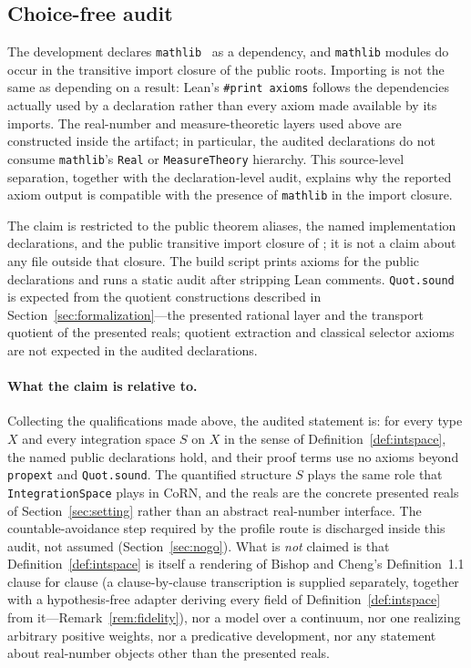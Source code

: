 \documentclass[11pt]{article}
\theoremstyle{definition}
\theoremstyle{remark}
\begin{document}
\subsection{Choice-free audit}
\label{sec:audit}

The development declares \texttt{mathlib}~\cite{mathlib-2020} as a dependency, and \texttt{mathlib} modules do occur in the transitive import closure of the public roots.  Importing is not the same as depending on a result: Lean's \texttt{\#print axioms} follows the dependencies actually used by a declaration rather than every axiom made available by its imports.  The real-number and measure-theoretic layers used above are constructed inside the artifact; in particular, the audited declarations do not consume \texttt{mathlib}'s \texttt{Real} or \texttt{MeasureTheory} hierarchy.  This source-level separation, together with the declaration-level audit, explains why the reported axiom output is compatible with the presence of \texttt{mathlib} in the import closure.

The claim is restricted to the public theorem aliases, the named implementation declarations, and the public transitive import closure of ; it is not a claim about any file outside that closure.  The build script prints axioms for the public declarations and runs a static audit after stripping Lean comments.  \texttt{Quot.sound} is expected from the quotient constructions described in Section~\ref{sec:formalization}---the presented rational layer and the transport quotient of the presented reals; quotient extraction and classical selector axioms are not expected in the audited declarations.

\paragraph{What the claim is relative to.}
Collecting the qualifications made above, the audited statement is: for every type \(X\) and every integration space $S$ on $X$ in the sense of Definition~\ref{def:intspace}, the named public declarations hold, and their proof terms use no axioms beyond \texttt{propext} and \texttt{Quot.sound}.  The quantified structure \(S\) plays the same role that \texttt{IntegrationSpace} plays in CoRN, and the reals are the concrete presented reals of Section~\ref{sec:setting} rather than an abstract real-number interface.  The countable-avoidance step required by the profile route is discharged inside this audit, not assumed (Section~\ref{sec:nogo}).  What is \emph{not} claimed is that Definition~\ref{def:intspace} is itself a rendering of Bishop and Cheng's Definition~1.1 clause for clause (a clause-by-clause transcription is supplied separately, together with a hypothesis-free adapter deriving every field of Definition~\ref{def:intspace} from it---Remark~\ref{rem:fidelity}), nor a model over a continuum, nor one realizing arbitrary positive weights, nor a predicative development, nor any statement about real-number objects other than the presented reals.
\end{document}
